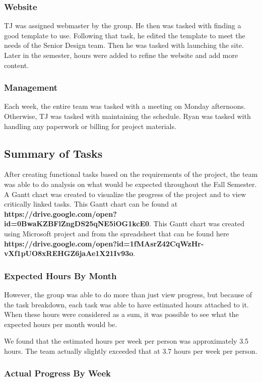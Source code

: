 \documentclass[PPFS.tex]{template/subfiles}
\begin{document}
\subsubsection{Website}
TJ was assigned webmaster by the group. He then was tasked with finding a good template to use. Following that task, he edited the template to meet the needs of the Senior Design team. Then he was tasked with launching the site. Later in the semester, hours were added to refine the website and add more content.

\subsubsection{Management}
Each week, the entire team was tasked with a meeting on Monday afternoons. Otherwise, TJ was tasked with maintaining the schedule. Ryan was tasked with handling any paperwork or billing for project materials.


\subsection{Summary of Tasks}
After creating functional tasks based on the requirements of the project, the team was able to do analysis on what would be expected throughout the Fall Semester. A Gantt chart was created to visualize the progress of the project and to view critically linked tasks.
This Gantt chart can be found at \textbf{https://drive.google.com/open?id=0BwaKZBFlZngDS25qNE5iOG1kcE0}. This Gantt chart was created using Microsoft project and from the spreadsheet that can be found here \textbf{https://drive.google.com/open?id=1fMAsrZ42CqWzHr-vXf1pUO8xREHGZ6jaAe1X21Iv93o}.

\subsubsection{Expected Hours By Month}
However, the group was able to do more than just view progress, but because of the task breakdown, each task was able to have estimated hours attached to it. When these hours were considered as a sum, it was possible to see what the expected hours per month would be.

We found that the estimated hours per week per person was approximately 3.5 hours. The team actually slightly exceeded that at 3.7 hours per week per person.

\subsubsection{Actual Progress By Week}
\end{document}
